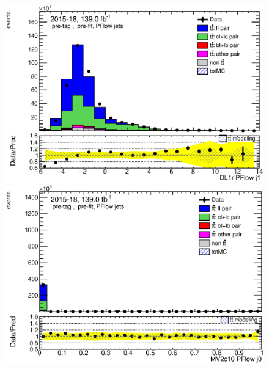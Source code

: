 \documentclass[letterpaper,12pt]{article}
\begin{document}
\begin{figure}[H]
\begin{minipage}[b]{.45\textwidth}
	\end{minipage}\hfill
	\begin{minipage}[b]{.45\textwidth}
	\centering
	\includegraphics[width=1\textwidth]{Oct_distributions/pretagNoRwDL1rwithhighpTPFlow_scaledall/DataMC__J1_DL1r.eps}
	\end{minipage}\hfill
	\begin{minipage}[b]{.45\textwidth}
	\centering
	\includegraphics[width=1\textwidth]{Oct_distributions/pretagNoRwDL1rwithhighpTPFlow_scaledall/DataMC_J0_MV2c10.eps}
	\end{minipage}\hfill
	\begin{minipage}[b]{.45\textwidth}
	\centering

\end{minipage}
\end{figure}
\end{document}
